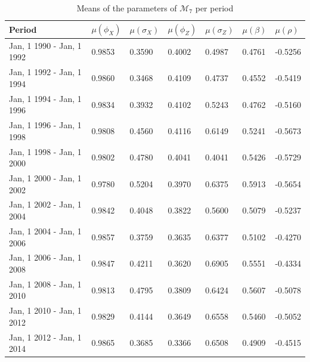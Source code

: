 \documentclass[11pt,a4,twosided,singlespacing,titlepagenumber=on]{scrreprt}
\numberwithin{equation}{chapter} %
\theoremstyle{remark}
\begin{document}
\renewcommand{\arraystretch}{0.9}%
\begin{table}[H]
\centering
\begin{tabular}{lllllll}
\hline
\multicolumn{1}{|l|}{Period} & \multicolumn{1}{|l|}{$\mu(\phi_X)$} & \multicolumn{1}{|l|}{$\mu(\sigma_X)$} & \multicolumn{1}{|l|}{$\mu(\phi_Z)$} & \multicolumn{1}{|l|}{$\mu(\sigma_Z)$} & \multicolumn{1}{|l|}{$\mu(\beta)$} & \multicolumn{1}{|l|}{$\mu(\rho)$} \\ \hline
Jan, 1 1990 - Jan, 1 1992 &  0.9853 & 0.3590 & 0.4002 & 0.4987 & 0.4761 & -0.5256 \\
Jan, 1 1992 - Jan, 1 1994 &  0.9860 & 0.3468 & 0.4109 & 0.4737 & 0.4552 & -0.5419 \\ 
Jan, 1 1994 - Jan, 1 1996 &  0.9834 & 0.3932 & 0.4102 & 0.5243 & 0.4762 & -0.5160 \\
Jan, 1 1996 - Jan, 1 1998 &  0.9808 & 0.4560 & 0.4116 & 0.6149 & 0.5241 & -0.5673 \\
Jan, 1 1998 - Jan, 1 2000 &  0.9802 & 0.4780 & 0.4041 & 0.4041 & 0.5426 & -0.5729 \\
Jan, 1 2000 - Jan, 1 2002 &  0.9780 & 0.5204 & 0.3970 & 0.6375 & 0.5913 & -0.5654 \\
Jan, 1 2002 - Jan, 1 2004 &  0.9842 & 0.4048 & 0.3822 & 0.5600 & 0.5079 & -0.5237 \\
Jan, 1 2004 - Jan, 1 2006 &  0.9857 & 0.3759 & 0.3635 & 0.6377 & 0.5102 & -0.4270 \\
Jan, 1 2006 - Jan, 1 2008 &  0.9847 & 0.4211 & 0.3620 & 0.6905 & 0.5551 & -0.4334 \\
Jan, 1 2008 - Jan, 1 2010 &  0.9813 & 0.4795 & 0.3809 & 0.6424 & 0.5607 & -0.5078 \\
Jan, 1 2010 - Jan, 1 2012 &  0.9829 & 0.4144 & 0.3649 & 0.6558 & 0.5460 & -0.5052\\
Jan, 1 2012 - Jan, 1 2014 &  0.9865 & 0.3685 & 0.3366 & 0.6508 & 0.4909 & -0.4515\\
\hline
\end{tabular}
\caption{Means of the parameters of $\mathcal{M}_7$ per period}
\label{tab:param_stats_1992_2014}
\end{table}

\end{document}
